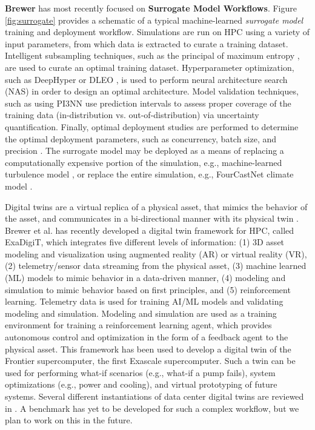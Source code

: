 \documentclass[utf8]{FrontiersinVancouver} %
\begin{document}
{\bf Brewer} has most recently focused on  {\bf Surrogate Model Workflows}. Figure \ref{fig:surrogate} provides a schematic of a typical machine-learned \textit{surrogate model} training and deployment workflow. Simulations are run on HPC using a variety of input parameters, from which data is extracted to curate a training dataset. Intelligent subsampling techniques, such as the principal of maximum entropy \cite{brewer2023entropy}, are used to curate an optimal training dataset. Hyperparameter optimization, such as DeepHyper \cite{balaprakash2018deephyper} or DLEO \cite{martinez2018deep}, is used to perform neural architecture search (NAS) in order to design an optimal architecture. Model validation techniques, such as using PI3NN \cite{liu2021pi3nn} use prediction intervals to assess proper coverage of the training data (in-distribution vs. out-of-distribution) via uncertainty quantification. Finally, optimal deployment studies are performed to determine the optimal deployment parameters, such as concurrency, batch size, and precision \cite{brewer2021production}. The surrogate model may be deployed as a means of replacing a computationally expensive portion of the simulation, e.g., machine-learned turbulence model \cite{bhushan2021development}, or replace the entire simulation, e.g., FourCastNet climate model \cite{pathak2022fourcastnet}.

Digital twins are a virtual replica of a physical asset, that mimics the behavior of the asset, and communicates in a bi-directional manner with its physical twin \cite{nas2023foundational}.   Brewer et al. \cite{brewer2024digital} has recently developed a digital twin framework for HPC, called ExaDigiT, which integrates five different levels of information: (1) 3D asset modeling and visualization using augmented reality (AR) or virtual reality (VR), (2) telemetry/sensor data streaming from the physical asset, (3) machine learned (ML) models to mimic behavior in a data-driven manner, (4) modeling and simulation to mimic behavior based on first principles, and (5) reinforcement learning. Telemetry data is used for training AI/ML models and validating modeling and simulation. Modeling and simulation are used as a training environment for training a reinforcement learning agent, which provides autonomous control and optimization in the form of a feedback agent to the physical asset. This framework has been used to develop a digital twin of the Frontier supercomputer, the first Exascale supercomputer. Such a twin can be used for performing what-if scenarios (e.g., what-if a pump fails), system optimizations (e.g., power and cooling), and virtual prototyping of future systems. Several different instantiations of data center digital twins are reviewed in \cite{athavale2024digital}. A benchmark has yet to be developed for such a complex workflow, but we plan to work on this in the future. 
\end{document}
